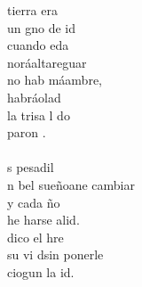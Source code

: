 \begin{cancion}%
	 tierra era\\
	 un gno de id\\
	cuando eda\\
	noráaltareguar\\
	no hab máambre,\\
	habráolad\\
	la trisa l do\\
	paron .\\
\jump\\
	s pesadil\\
	n bel sueñoane cambiar\\
	y cada ño\\
	he harse alid.\\
	 dico el hre \\
	 su vi dsin ponerle\\
	ciogun la id.\\
\end{cancion}%
